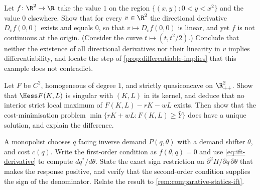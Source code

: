 \begin{exercise}\label{ex:cn-1}
	Let $f\colon\R^2\to\R$ take the value $1$ on the region
	$\{(x,y) : 0<y<x^2\}$ and the value $0$ elsewhere. Show that for every
	$v\in\R^2$ the directional derivative $D_vf(0,0)$ exists and equals $0$, so
	that $v\mapsto D_vf(0,0)$ is linear, and yet $f$ is not continuous at the
	origin. (Consider the curve $t\mapsto(t,t^2/2)$.) Conclude that neither the
	existence of all directional derivatives nor their linearity in $v$ implies
	differentiability, and locate the step of
	\autoref{prop:differentiable-implies} that this example does not contradict.
\end{exercise}

\begin{exercise}\label{ex:cn-2}
	Let $F$ be $C^2$, homogeneous of degree $1$, and strictly quasiconcave on
	$\R^2_{++}$. Show that $\Hess F(K,L)$ is singular with $(K,L)$ in its kernel,
	and deduce that no interior strict local maximum of
	$F(K,L)-rK-wL$ exists. Then show that the cost-minimisation problem
	$\min\{rK+wL : F(K,L)\geq\bar Y\}$ does have a unique solution, and explain the
	difference.
\end{exercise}

\begin{exercise}\label{ex:cn-3}
	A monopolist chooses $q$ facing inverse demand $P(q,\theta)$ with a demand
	shifter $\theta$, and cost $c(q)$. Write the first-order condition as
	$f(\theta,q)=0$ and use \eqref{eq:ift-derivative} to compute
	$dq^\ast/d\theta$. State the exact sign restriction on
	$\partial^2\Pi/\partial q\,\partial\theta$ that makes the response positive, and
	verify that the second-order condition supplies the sign of the denominator.
	Relate the result to \autoref{rem:comparative-statics-ift}.
\end{exercise}
